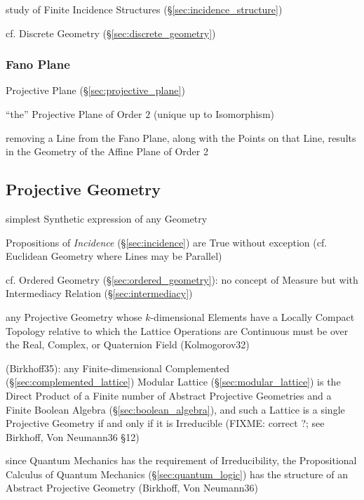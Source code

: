 study of Finite Incidence Structures (\S\ref{sec:incidence_structure})

cf. Discrete Geometry (\S\ref{sec:discrete_geometry})



\subsubsection{Fano Plane}\label{sec:fano_plane}

Projective Plane (\S\ref{sec:projective_plane})

``the'' Projective Plane of Order $2$ (unique up to Isomorphism)

removing a Line from the Fano Plane, along with the Points on that Line, results
in the Geometry of the Affine Plane of Order 2



\subsection{Projective Geometry}\label{sec:projective_geometry}

simplest Synthetic expression of any Geometry

Propositions of \emph{Incidence} (\S\ref{sec:incidence}) are True without
exception (cf. Euclidean Geometry where Lines may be Parallel)

\fist cf. Ordered Geometry (\S\ref{sec:ordered_geometry}): no concept of Measure
but with Intermediacy Relation (\S\ref{sec:intermediacy})

any Projective Geometry whose $k$-dimensional Elements have a Locally Compact
Topology relative to which the Lattice Operations are Continuous must be over
the Real, Complex, or Quaternion Field (Kolmogorov32)

(Birkhoff35): any Finite-dimensional Complemented
(\S\ref{sec:complemented_lattice}) Modular Lattice (\S\ref{sec:modular_lattice})
is the Direct Product of a Finite number of Abstract Projective Geometries and a
Finite Boolean Algebra (\S\ref{sec:boolean_algebra}), and such a
Lattice is a single Projective Geometry if and only if it is Irreducible
(FIXME: correct ?; see Birkhoff, Von Neumann36 \S 12)

since Quantum Mechanics has the requirement of Irreducibility, the Propositional
Calculus of Quantum Mechanics (\S\ref{sec:quantum_logic}) has the structure of
an Abstract Projective Geometry (Birkhoff, Von Neumann36)

